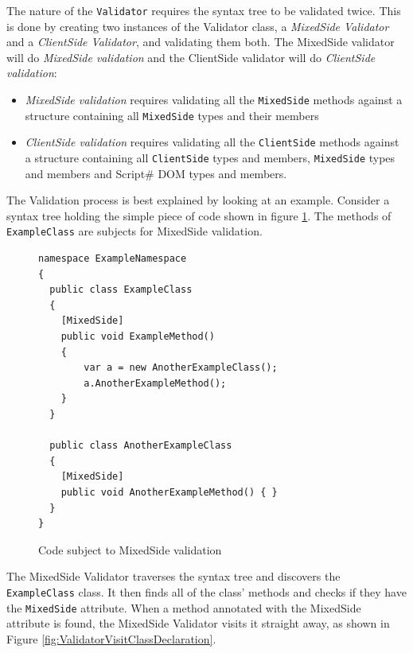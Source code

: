The nature of the \texttt{Validator} requires the syntax tree to be validated twice. This is done by creating two instances of the Validator class, a \emph{MixedSide Validator} and a \emph{ClientSide Validator}, and validating them both. 
The MixedSide validator will do \emph{MixedSide validation} and the ClientSide validator will do \emph{ClientSide validation}:

\begin{itemize}
	\item \emph{MixedSide validation} requires validating all the \texttt{MixedSide} methods against a structure containing all \texttt{MixedSide} types and their members
	\item \emph{ClientSide validation} requires validating all the \texttt{ClientSide} methods against a structure containing all \texttt{ClientSide} types and members, \texttt{MixedSide} types and members and Script\# DOM types and members.
\end{itemize}


The Validation process is best explained by looking at an example. Consider a syntax tree holding the simple piece of code shown in figure \ref{fig:mixedSideValidationExample}. The methods of \texttt{ExampleClass} are subjects for MixedSide validation.

\begin{figure}[H]
	\begin{lstlisting}[language=CSharp,classoffset=1,morekeywords={ExampleClass,AnotherExampleClass,MixedSide}]
namespace ExampleNamespace
{
  public class ExampleClass
  {
  	[MixedSide]
  	public void ExampleMethod()
  	{
  		var a = new AnotherExampleClass();
  		a.AnotherExampleMethod();
  	}
  }
  
  public class AnotherExampleClass
  {
  	[MixedSide]
  	public void AnotherExampleMethod() { }
  }
}
	\end{lstlisting}
	\caption{Code subject to MixedSide validation}
	\label{fig:mixedSideValidationExample}
\end{figure}		

The MixedSide Validator traverses the syntax tree and discovers the \texttt{ExampleClass} class. It then finds all of the class' methods and checks if they have the \texttt{MixedSide} attribute. When a method annotated with the MixedSide attribute is found, the MixedSide Validator visits it straight away, as shown in Figure \ref{fig:ValidatorVisitClassDeclaration}. 


